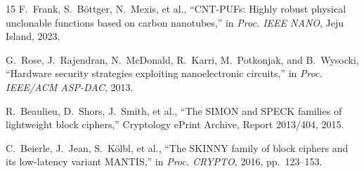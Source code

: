 \documentclass[conference]{IEEEtran}
\begin{document}
\begin{thebibliography}{15}
F.~Frank, S.~B\"{o}ttger, N.~Mexis, et al.,
``CNT-PUFs: Highly robust physical unclonable functions based on carbon nanotubes,''
in \textit{Proc. IEEE NANO}, Jeju Island, 2023.

G.~Rose, J.~Rajendran, N.~McDonald, R.~Karri, M.~Potkonjak, and B.~Wysocki,
``Hardware security strategies exploiting nanoelectronic circuits,''
in \textit{Proc. IEEE/ACM ASP-DAC}, 2013.

R.~Beaulieu, D.~Shors, J.~Smith, et al.,
``The SIMON and SPECK families of lightweight block ciphers,''
Cryptology ePrint Archive, Report 2013/404, 2015.

C.~Beierle, J.~Jean, S.~K\"{o}lbl, et al.,
``The SKINNY family of block ciphers and its low-latency variant MANTIS,''
in \textit{Proc. CRYPTO}, 2016, pp.~123--153.

\end{thebibliography}
\end{document}
